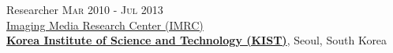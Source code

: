 \documentclass[letterpaper,10pt]{article} %
\newcommand{\blankline}{\quad\pagebreak[2]}
\begin{document}
Researcher \hfill{\textsc{Mar 2010 - Jul 2013}}\\
\href{https://www.imrc.kist.re.kr/en/}{Imaging Media Research Center (IMRC)}\\
\href{https://eng.kist.re.kr/}{\textbf{Korea Institute of Science and Technology (KIST)}}, Seoul, South Korea\\
%		
%		
%		
%		
\blankline

%
\end{document}
